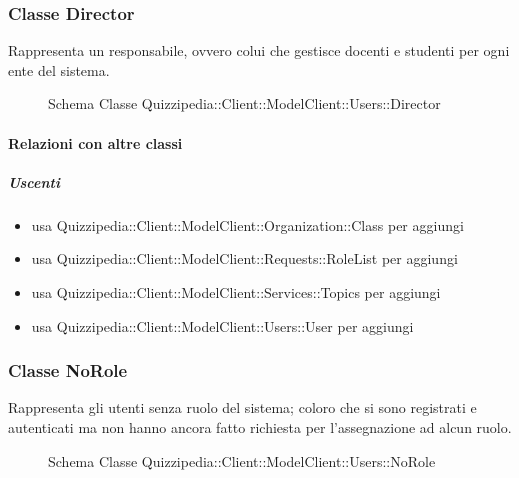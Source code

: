 \subsubsection{Classe Director}
Rappresenta un responsabile, ovvero colui che gestisce docenti e studenti per ogni ente del sistema.
\begin{figure}[H]
\centering
\noindent{}
\caption[Schema Classe Director]{Schema Classe Quizzipedia::Client::ModelClient::Users::Director}
\end{figure}
\paragraph{Relazioni con altre classi}
\subparagraph{Uscenti}
\begin{itemize}
\item usa Quizzipedia::Client::ModelClient::Organization::Class per aggiungi
\item usa Quizzipedia::Client::ModelClient::Requests::RoleList per aggiungi
\item usa Quizzipedia::Client::ModelClient::Services::Topics per aggiungi
\item usa Quizzipedia::Client::ModelClient::Users::User per aggiungi
\end{itemize}
\subsubsection{Classe NoRole}
Rappresenta gli utenti senza ruolo del sistema; coloro che si sono registrati e autenticati ma non hanno ancora fatto richiesta per l'assegnazione ad alcun ruolo.
\begin{figure}[H]
\centering
\noindent{}
\caption[Schema Classe NoRole]{Schema Classe Quizzipedia::Client::ModelClient::Users::NoRole}
\end{figure}

